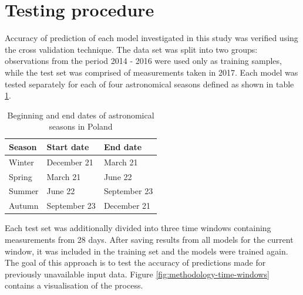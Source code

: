 \section{Testing procedure} \label{sec:methodology-testing-procedure}
Accuracy of prediction of each model investigated in this study was verified using the cross validation technique. The data set was split into two groups: observations from the period 2014 - 2016 were used only as training samples, while the test set was comprised of measurements taken in 2017. Each model was tested separately for each of four astronomical seasons defined as shown in table \ref{methodology:seasons}.
\begin{table}[H]
\centering
\caption{Beginning and end dates of astronomical seasons in Poland}
\label{methodology:seasons}
\begin{tabular}{lll}
\toprule
Season & Start date & End date \\ \midrule
Winter & December 21 & March 21 \\
Spring & March 21 & June 22 \\
Summer & June 22 & September 23 \\
Autumn & September 23 & December 21 \\ \bottomrule
\end{tabular}
\end{table}
\noindent Each test set was additionally divided into three time windows containing measurements from 28 days. After saving results from all models for the current window, it was included in the training set and the models were trained again. The goal of this approach is to test the accuracy of predictions made for previously unavailable input data. Figure \ref{fig:methodology-time-windows} contains a visualisation of the process.


